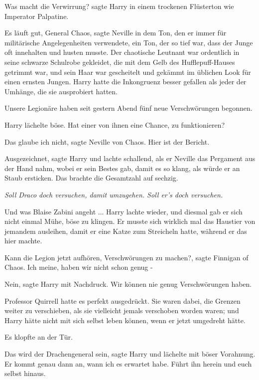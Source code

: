 \glqq{}Was macht die Verwirrung?\grqq{} sagte Harry in einem trockenen Flüsterton
wie Imperator Palpatine.

\glqq{}Es läuft gut, General Chaos\grqq{}, sagte Neville in dem Ton, den er immer
für militärische Angelegenheiten verwendete, ein Ton, der so tief war, dass der
Junge oft innehalten und husten musste. Der chaotische Leutnant war ordentlich
in seine schwarze Schulrobe gekleidet, die mit dem Gelb des Hufflepuff-Hauses
getrimmt war, und sein Haar war gescheitelt und gekämmt im üblichen Look für
einen ernsten Jungen. Harry hatte die Inkongruenz besser gefallen als jeder der
Umhänge, die sie ausprobiert hatten.

\glqq{}Unsere Legionäre haben seit gestern Abend fünf neue Verschwörungen
begonnen.\grqq{}

Harry lächelte böse. \glqq{}Hat einer von ihnen eine Chance, zu funktionieren?\grqq{}

\glqq{}Das glaube ich nicht\grqq{}, sagte Neville von Chaos. \glqq{}Hier ist der
Bericht.\grqq{}

\glqq{}Ausgezeichnet\grqq{}, sagte Harry und lachte schallend, als er Neville das
Pergament aus der Hand nahm, wobei er sein Bestes gab, damit es so klang, als
würde er an Staub ersticken. Das brachte die Gesamtzahl auf sechzig.

\emph{Soll Draco doch versuchen, damit umzugehen. Soll er's doch versuchen.}

Und was Blaise Zabini angeht ... Harry lachte wieder, und diesmal gab er sich
nicht einmal Mühe, böse zu klingen. Er musste sich wirklich mal das Haustier von
jemandem ausleihen, damit er eine Katze zum Streicheln hatte, während er das
hier machte.

\glqq{}Kann die Legion jetzt aufhören, Verschwörungen zu machen?\grqq{}, sagte
Finnigan of Chaos. \glqq{}Ich meine, haben wir nicht schon genug -\grqq{}

\glqq{}Nein\grqq{}, sagte Harry mit Nachdruck. \glqq{}Wir können nie genug
Verschwörungen haben.\grqq{}

Professor Quirrell hatte es perfekt ausgedrückt. Sie waren dabei, die Grenzen
weiter zu verschieben, als sie vielleicht jemals verschoben worden waren; und
Harry hätte nicht mit sich selbst leben können, wenn er jetzt umgedreht hätte.

Es klopfte an der Tür.

\glqq{}Das wird der Drachengeneral sein\grqq{}, sagte Harry und lächelte mit
böser Vorahnung. \glqq{}Er kommt genau dann an, wann ich es erwartet habe. Führt
ihn herein und euch selbst hinaus.\grqq{}

